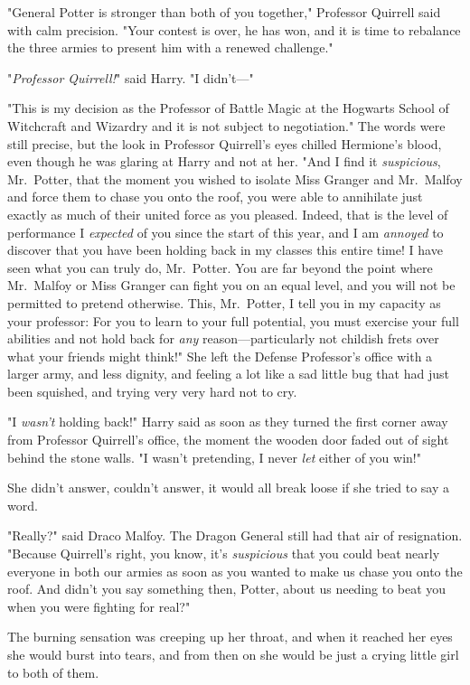 "General Potter is stronger than both of you together," Professor Quirrell said
with calm precision. "Your contest is over, he has won, and it is time to
rebalance the three armies to present him with a renewed challenge."

"\emph{Professor Quirrell!}" said Harry. "I didn't---"

"This is my decision as the Professor of Battle Magic at the Hogwarts School of
Witchcraft and Wizardry and it is not subject to negotiation." The words were
still precise, but the look in Professor Quirrell's eyes chilled Hermione's
blood, even though he was glaring at Harry and not at her. "And I find it
\emph{suspicious}, Mr.~Potter, that the moment you wished to isolate Miss
Granger and Mr.~Malfoy and force them to chase you onto the roof, you were able
to annihilate just exactly as much of their united force as you pleased.
Indeed, that is the level of performance I \emph{expected} of you since the
start of this year, and I am \emph{annoyed} to discover that you have been
holding back in my classes this entire time! I have seen what you can truly do,
Mr.~Potter. You are far beyond the point where Mr.~Malfoy or Miss Granger can
fight you on an equal level, and you will not be permitted to pretend
otherwise. This, Mr.~Potter, I tell you in my capacity as your professor: For
you to learn to your full potential, you must exercise your full abilities and
not hold back for \emph{any} reason---particularly not childish frets over what
your friends might think!"
\later
She left the Defense Professor's office with a larger army, and less dignity,
and feeling a lot like a sad little bug that had just been squished, and trying
very very hard not to cry.

"I \emph{wasn't} holding back!" Harry said as soon as they turned the first
corner away from Professor Quirrell's office, the moment the wooden door faded
out of sight behind the stone walls. "I wasn't pretending, I never \emph{let}
either of you win!"

She didn't answer, couldn't answer, it would all break loose if she tried to
say a word.

"Really?" said Draco Malfoy. The Dragon General still had that air of
resignation. "Because Quirrell's right, you know, it's \emph{suspicious} that
you could beat nearly everyone in both our armies as soon as you wanted to make
us chase you onto the roof. And didn't you say something then, Potter, about us
needing to beat you when you were fighting for real?"

The burning sensation was creeping up her throat, and when it reached her eyes
she would burst into tears, and from then on she would be just a crying little
girl to both of them.

